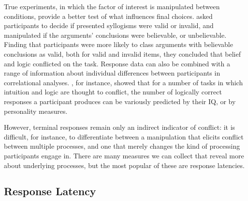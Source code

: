 True experiments, in which the factor of interest
is manipulated between conditions,
provide a better test of what influences final choices.
\citet{Evans1983} asked participants to decide
if presented syllogisms were valid or invalid,
and manipulated if the arguments' conclusions
were believable, or unbelievable.
Finding that participants were more likely to class arguments
with believable conclusions as valid,
both for valid and invalid items,
they concluded that belief and logic conflicted on the task.
Response data can also be combined with a range of
information about individual differences between participants
in correlational analyses.
\citet{Stanovich1999,Stanovich2000,Stanovich2008}, for instance,
showed that for a number of tasks in which
intuition and logic are thought to conflict,
the number of logically correct responses a participant produces
can be variously predicted by their IQ,
or by personality measures.

However, terminal responses remain only an indirect indicator of conflict:
it is difficult, for instance, to differentiate between
a manipulation that elicits conflict between multiple processes,
and one that merely changes the kind of processing participants engage in.
There are many measures we can collect
that reveal more about underlying processes,
but the most popular of these are response latencies.


\subsection{Response Latency}
\label{subsec:chapter1-measurement-latency}


